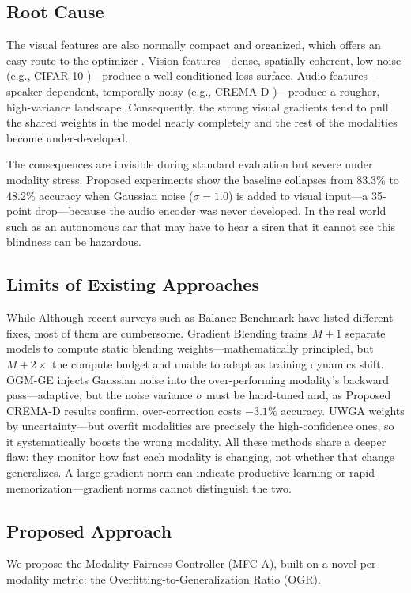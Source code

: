 \documentclass[preprint,a4paper, 10pt, 5p]{elsarticle}
\begin{document}
\subsection*{Root Cause}
The visual features are also normally compact and organized, which offers an easy route to the optimizer \cite{pezeshki2021gradient}. Vision features---dense, spatially coherent, low-noise (e.g., CIFAR-10 \cite{krizhevsky2009learning})---produce a well-conditioned loss surface. Audio features---speaker-dependent, temporally noisy (e.g., CREMA-D \cite{cao2014crema})---produce a rougher, high-variance landscape. Consequently, the strong visual gradients tend to pull the shared weights in the model nearly completely and the rest of the modalities become under-developed.

The consequences are invisible during standard evaluation but severe under modality stress. Proposed experiments show the baseline collapses from 83.3\% to 48.2\% accuracy when Gaussian noise ($\sigma = 1.0$) is added to visual input---a 35-point drop---because the audio encoder was never developed. In the real world such as an autonomous car that may have to hear a siren that it cannot see this blindness can be hazardous.

\subsection*{Limits of Existing Approaches}
While Although recent surveys such as Balance Benchmark \cite{xu2025balancebenchmark} have listed different fixes, most of them are cumbersome. Gradient Blending \cite{wang2020makes} trains $M{+}1$ separate models to compute static blending weights---mathematically principled, but $M{+}2\times$ the compute budget and unable to adapt as training dynamics shift. OGM-GE \cite{peng2022balanced} injects Gaussian noise into the over-performing modality's backward pass---adaptive, but the noise variance $\sigma$ must be hand-tuned and, as Proposed CREMA-D results confirm, over-correction costs $-3.1\%$ accuracy. UWGA \cite{kendall2018multi} weights by uncertainty---but overfit modalities are precisely the high-confidence ones, so it systematically boosts the wrong modality. All these methods share a deeper flaw: they monitor how fast each modality is changing, not whether that change generalizes. A large gradient norm can indicate productive learning or rapid memorization---gradient norms cannot distinguish the two.

\subsection*{Proposed Approach}
We propose the Modality Fairness Controller (MFC-A), built on a novel per-modality metric: the Overfitting-to-Generalization Ratio (OGR).
\end{document}
